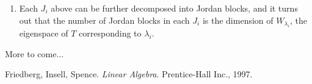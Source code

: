 \documentclass[12pt]{article}
\begin{document}
\begin{enumerate}
\item Each $J_i$ above can be further decomposed into Jordan blocks, and it turns out that the number of Jordan blocks in each $J_i$ is the dimension of $W_{\lambda_i}$, the eigenspace of $T$ corresponding to $\lambda_i$.
\end{enumerate}

More to come...

\begin{thebibliography}{3}
 Friedberg, Insell, Spence. {\it Linear Algebra}. Prentice-Hall Inc., 1997.
\end{thebibliography}
\end{document}
